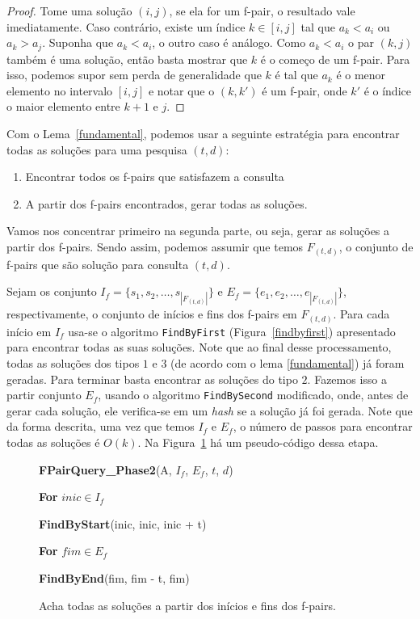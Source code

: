 \documentclass[12pt]{article}
\begin{document}
\begin{proof}
Tome uma solução $(i, j)$, se ela for um f-pair, o resultado vale imediatamente.
Caso contrário, existe um índice $k \in [i, j]$ tal que $a_k < a_i$ ou $a_k > a_j$.
Suponha que $a_k < a_i$, o outro caso é análogo. Como $a_k < a_i$ o par $(k, j)$ também
é uma solução, então basta mostrar que $k$ é o começo de um f-pair. Para isso, podemos
supor sem perda de generalidade que $k$ é tal que $a_k$ é o menor elemento no intervalo
$[i, j]$ e notar que o $(k, k')$ é um f-pair, onde $k'$ é o índice o maior elemento entre $k + 1$ e $j$.
\end{proof}

Com o Lema~\ref{fundamental}, podemos usar a seguinte estratégia 
para encontrar todas as soluções para uma pesquisa $(t,d)$:

\begin{enumerate}
\item Encontrar todos os f-pairs que satisfazem a consulta 
\item A partir dos f-pairs encontrados, gerar todas as soluções.
\end{enumerate}

Vamos nos concentrar primeiro na segunda parte, ou seja, gerar as soluções
a partir dos f-pairs. Sendo assim, podemos assumir que temos 
$F_{(t,d)}$, o conjunto de f-pairs que são solução para
consulta $(t,d)$. 

Sejam os conjunto $I_f = \{s_1, s_2, \ldots, s_{|F_{(t,d)}|}\}$
e $E_f = \{e_1, e_2, \ldots, e_{|F_{(t,d)}|}\}$, respectivamente, o conjunto de inícios e fins 
dos f-pairs em $F_{(t,d)}$. Para cada início em $I_f$ usa-se o algoritmo \verb|FindByFirst| (Figura~\ref{findbyfirst})
apresentado para encontrar todas as suas soluções.  Note que ao final desse processamento, todas
as soluções dos tipos $1$ e $3$ (de acordo com o lema \ref{fundamental}) já foram geradas. Para terminar
basta encontrar as soluções do tipo $2$. Fazemos isso  a partir conjunto $E_f$, usando o algoritmo
\verb|FindBySecond| modificado, onde, antes de gerar cada solução, ele verifica-se em um \textit{hash} se a solução
já foi gerada. Note que da forma descrita, uma vez que temos $I_f$ e $E_f$, o número de passos para encontrar todas as soluções é $O(k)$.
Na Figura~\ref{fpairqueryphase2} há um pseudo-código dessa etapa.

\begin{figure}
\begin{framed}
{\bf FPairQuery\_Phase2}(A, $I_f$, $E_f$, $t$, $d$)

\hspace{1cm} {\bf For} $inic \in I_f$

\hspace{2cm} {\bf FindByStart}(inic, inic, inic + t)

\hspace{1cm} {\bf For} $fim \in E_f$

\hspace{2cm} {\bf FindByEnd}(fim, fim - t, fim)

\caption{Acha todas as soluções a partir dos inícios e fins dos f-pairs.}
\label{fpairqueryphase2}
\end{framed}
\end{figure}
\end{document}
